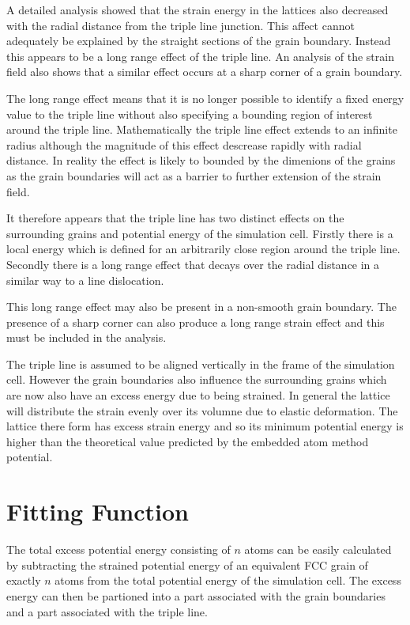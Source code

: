 \documentclass[12pt,a4paper]{book}
\begin{document}
A detailed analysis showed that the strain energy in the lattices also decreased with the radial distance from the triple line junction. This affect cannot adequately be explained by the straight sections of the grain boundary. Instead this appears to be a long range effect of the triple line. An analysis of the strain field also shows that a similar effect occurs at a sharp corner of a grain boundary.
 
The long range effect means that it is no longer possible to identify a fixed energy value to the triple line without also specifying a bounding region of interest around the triple line. Mathematically the triple line effect extends to an infinite radius although the magnitude of this effect descrease rapidly with radial distance. In reality the effect is likely to bounded by the dimenions of the grains as the grain boundaries will act as a barrier to further extension of the strain field. 

It therefore appears that the triple line has two distinct effects on the surrounding grains and potential energy of the simulation cell. Firstly there is a local energy which is defined for an arbitrarily close region around the triple line. Secondly there is a long range effect that decays over the radial distance in a similar way to a line dislocation.

This long range effect may also be present in a non-smooth grain boundary. The presence of a sharp corner can also produce a long range strain effect and this must be included in the analysis.

The triple line is assumed to be aligned vertically in the frame of the simulation cell. However the grain boundaries also influence the surrounding grains which are now also have an excess energy due to being strained. In general the lattice will distribute the strain evenly over its volumne due to elastic deformation. The lattice there form has excess strain energy and so its minimum  potential energy is higher than the theoretical value predicted by the embedded atom method potential.

\section{Fitting Function}

The total excess potential energy consisting of $n$ atoms can be easily calculated by subtracting the strained potential energy of an equivalent FCC grain of exactly $n$ atoms from the total potential energy of the simulation cell. The excess energy can then be partioned into a part associated with the grain boundaries and a part associated with the triple line.
\end{document}
